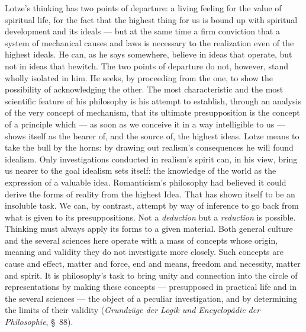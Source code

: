 \documentclass[12pt,a4paper]{book}
\newcommand{\opage}[1]{\marginnote{\footnotesize\textit{[#1]}}}
\begin{document}
Lotze's thinking has two points of departure: a living feeling for the value of
spiritual life, for the fact that the highest thing for us is bound up with
spiritual development and its ideals --- but at the same time a firm conviction
that a system of mechanical causes and laws is necessary to the realization even
of the highest ideals. He can, as he says somewhere, believe in ideas that
operate, but not in ideas that bewitch. The two points of departure do not,
however, stand wholly isolated in him. He seeks, by proceeding from the one, to
show the possibility of acknowledging the other. The most characteristic and the
most scientific feature of his philosophy is his attempt to establish, through an
analysis of the very concept of mechanism, that its ultimate presupposition is
the concept of a principle which --- as soon as we conceive it in a way
intelligible to us --- shows itself as the bearer of, and the source of, the
highest ideas. Lotze means to take the bull by the horns: by drawing out
realism's consequences he will found idealism. Only investigations conducted in
realism's spirit can, in his view, bring us nearer to the goal idealism sets
itself: the knowledge of the world as the expression of a valuable idea.
Romanticism's philosophy had believed it could derive the forms of reality from
the highest Idea. That has shown itself to be an insoluble task. We can, by
contrast, attempt by way of inference to go back from what is given to its
presuppositions. Not a \emph{deduction} but a \emph{reduction} is possible.
Thinking must always apply its forms to a given material. Both general culture
and the several sciences here operate with a mass of concepts whose origin,
meaning and validity they do not investigate more closely. Such concepts are
cause and \opage{514}effect, matter and force, end and means, freedom and necessity, matter
and spirit. It is philosophy's task to bring unity and connection into the circle
of representations by making these concepts --- presupposed in practical life and
in the several sciences --- the object of a peculiar investigation, and by
determining the limits of their validity (\textit{Grundzüge der Logik und
Encyclopädie der Philosophie}, §~88).
\end{document}
